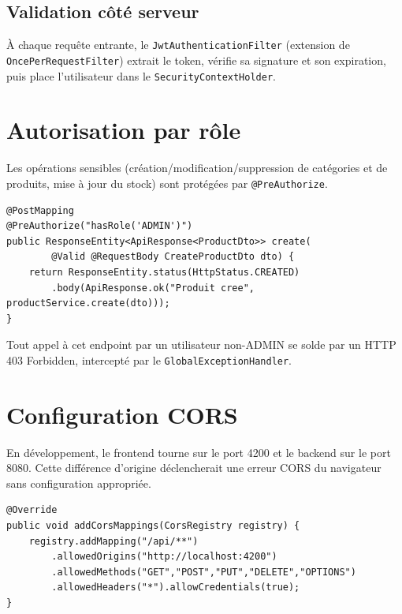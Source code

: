 \documentclass[11pt,a4paper,oneside]{report}
\begin{document}
\subsection{Validation côté serveur}

À chaque requête entrante, le \texttt{JwtAuthenticationFilter}
(extension de \texttt{OncePerRequestFilter}) extrait le token, vérifie sa
signature et son expiration, puis place l'utilisateur dans le
\texttt{SecurityContextHolder}.

\section{Autorisation par rôle}

Les opérations sensibles (création/modification/suppression de catégories
et de produits, mise à jour du stock) sont protégées par
\texttt{@PreAuthorize}.

\begin{lstlisting}[style=javastyle]
@PostMapping
@PreAuthorize("hasRole('ADMIN')")
public ResponseEntity<ApiResponse<ProductDto>> create(
        @Valid @RequestBody CreateProductDto dto) {
    return ResponseEntity.status(HttpStatus.CREATED)
        .body(ApiResponse.ok("Produit cree", productService.create(dto)));
}
\end{lstlisting}

Tout appel à cet endpoint par un utilisateur non-ADMIN se solde par un
HTTP 403 Forbidden, intercepté par le \texttt{GlobalExceptionHandler}.

\section{Configuration CORS}

En développement, le frontend tourne sur le port 4200 et le backend sur le
port 8080. Cette différence d'origine déclencherait une erreur CORS du
navigateur sans configuration appropriée.

\begin{lstlisting}[style=javastyle, caption=CorsConfig]
@Override
public void addCorsMappings(CorsRegistry registry) {
    registry.addMapping("/api/**")
        .allowedOrigins("http://localhost:4200")
        .allowedMethods("GET","POST","PUT","DELETE","OPTIONS")
        .allowedHeaders("*").allowCredentials(true);
}
\end{lstlisting}

\end{document}
